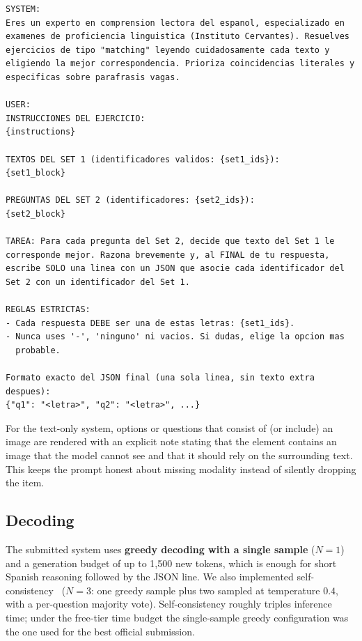 \documentclass{ceurart}   %
\begin{document}
\begin{lstlisting}[caption={Prompt template (system message and the skeleton
  of the user message). Curly-brace fields are filled per exercise.},
  label={lst:prompt}]
SYSTEM:
Eres un experto en comprension lectora del espanol, especializado en
examenes de proficiencia linguistica (Instituto Cervantes). Resuelves
ejercicios de tipo "matching" leyendo cuidadosamente cada texto y
eligiendo la mejor correspondencia. Prioriza coincidencias literales y
especificas sobre parafrasis vagas.

USER:
INSTRUCCIONES DEL EJERCICIO:
{instructions}

TEXTOS DEL SET 1 (identificadores validos: {set1_ids}):
{set1_block}

PREGUNTAS DEL SET 2 (identificadores: {set2_ids}):
{set2_block}

TAREA: Para cada pregunta del Set 2, decide que texto del Set 1 le
corresponde mejor. Razona brevemente y, al FINAL de tu respuesta,
escribe SOLO una linea con un JSON que asocie cada identificador del
Set 2 con un identificador del Set 1.

REGLAS ESTRICTAS:
- Cada respuesta DEBE ser una de estas letras: {set1_ids}.
- Nunca uses '-', 'ninguno' ni vacios. Si dudas, elige la opcion mas
  probable.

Formato exacto del JSON final (una sola linea, sin texto extra despues):
{"q1": "<letra>", "q2": "<letra>", ...}
\end{lstlisting}

For the text-only system, options or questions that consist of (or include)
an image are rendered with an explicit note stating that the element
contains an image that the model cannot see and that it should rely on the
surrounding text. This keeps the prompt honest about missing modality
instead of silently dropping the item.

\subsection{Decoding}
The submitted system uses \textbf{greedy decoding with a single sample}
(\mbox{$N=1$}) and a generation budget of up to 1{,}500 new tokens, which is
enough for short Spanish reasoning followed by the JSON line. We also
implemented self-consistency~\cite{wang2023selfconsistency} ($N=3$:
one greedy sample plus two sampled at temperature $0.4$, with a per-question
majority vote). Self-consistency roughly triples inference time; under the
free-tier time budget the single-sample greedy configuration was the one
used for the best official submission.
\end{document}
